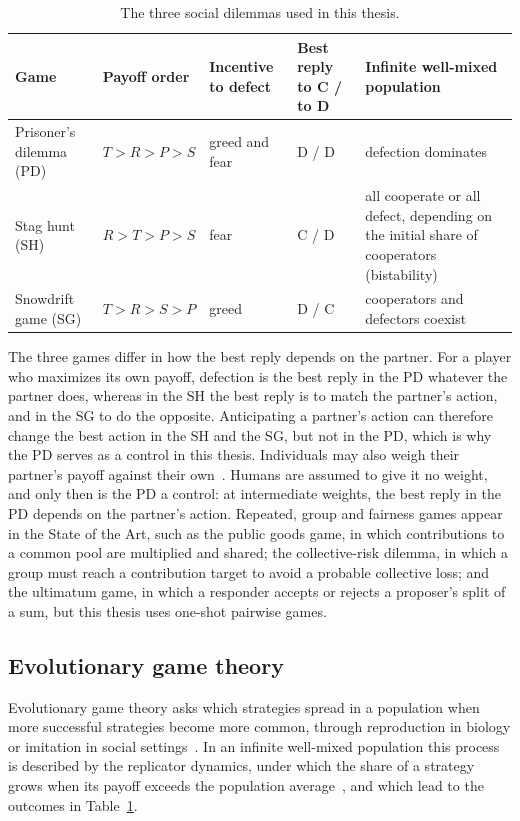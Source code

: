 \begin{table}[htbp]
\centering
\small
\caption{The three social dilemmas used in this thesis.}
\label{tab:dilemmas}
\begin{tabularx}{\textwidth}{@{}>{\raggedright\arraybackslash}p{}l>{\raggedright\arraybackslash}p{}>{\raggedright\arraybackslash}p{}>{\raggedright\arraybackslash}X@{}}
\toprule
Game & Payoff order & Incentive to defect & Best reply to C / to D & Infinite well-mixed population \\
\midrule
Prisoner's dilemma (PD) & $T>R>P>S$ & greed and fear & D / D & defection dominates \\
Stag hunt (SH) & $R>T>P>S$ & fear & C / D & all cooperate or all defect, depending on the initial share of cooperators (bistability) \\
Snowdrift game (SG) & $T>R>S>P$ & greed & D / C & cooperators and defectors coexist \\
\bottomrule
\end{tabularx}
\end{table}

The three games differ in how the best reply depends on the partner. For a player who maximizes its own payoff, defection is the best reply in the PD whatever the partner does, whereas in the SH the best reply is to match the partner's action, and in the SG to do the opposite. Anticipating a partner's action can therefore change the best action in the SH and the SG, but not in the PD, which is why the PD serves as a control in this thesis. Individuals may also weigh their partner's payoff against their own~\cite{guoEngineeringOptimalCooperation2024}. Humans are assumed to give it no weight, and only then is the PD a control: at intermediate weights, the best reply in the PD depends on the partner's action. Repeated, group and fairness games appear in the State of the Art, such as the public goods game, in which contributions to a common pool are multiplied and shared; the collective-risk dilemma, in which a group must reach a contribution target to avoid a probable collective loss; and the ultimatum game, in which a responder accepts or rejects a proposer's split of a sum, but this thesis uses one-shot pairwise games.

\subsection{Evolutionary game theory}

Evolutionary game theory asks which strategies spread in a population when more successful strategies become more common, through reproduction in biology or imitation in social settings~\cite{MaynardSmith1973}. In an infinite well-mixed population this process is described by the replicator dynamics, under which the share of a strategy grows when its payoff exceeds the population average~\cite{Taylor1978}, and which lead to the outcomes in Table~\ref{tab:dilemmas}.

